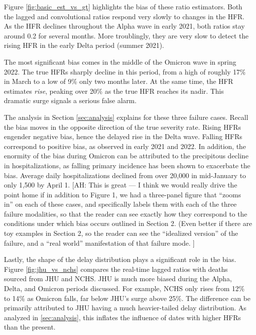 \documentclass{article}
\newcommand{\ahcomment}[1]{{\color{red}[AH: #1]}}
\begin{document}
Figure \ref{fig:basic_est_vs_gt} highlights the bias of these ratio estimators. Both the lagged and convolutional ratios respond very slowly to changes in the HFR. As the HFR declines throughout the Alpha wave in early 2021, both ratios stay around 0.2 for several months. More troublingly, they are very slow to detect the rising HFR in the early Delta period (summer 2021). %

The most significant bias comes in the middle of the Omicron wave in spring 2022. The true HFRs sharply decline in this period, from a high of roughly 17\% in March to a low of 9\% only two months later. At the same time, the HFR estimates \textit{rise}, peaking over 20\% as the true HFR reaches its nadir. This dramatic surge signals a serious false alarm. 

The analysis in Section \ref{sec:analysis} explains for these three failure cases. Recall the bias moves in the opposite direction of the true severity rate. Rising HFRs engender negative bias, hence the delayed rise in the Delta wave. Falling HFRs correspond to positive bias, as observed in early 2021 and 2022. In addition, the enormity of the bias during Omicron can be attributed to the precipitous decline in hospitalizations, as falling primary incidence has been shown to exacerbate the bias. Average daily hospitalizations declined from over 20,000 in mid-January to only 1,500 by April 1. 
\ahcomment{
This is great --- I think we would really drive the point home
if in addition to Figure 1, we had a three-panel figure that
``zooms in'' on each of these cases, and specifically labels them
with each of the three failure modalities, so that the reader
can see exactly how they correspond to the conditions under
which bias occurs outlined in Section 2.  (Even better if
there are toy examples in Section 2, so the reader can see
the ``idealized version'' of the failure, and a ``real world''
manifestation of that failure mode.
}

Lastly, the shape of the delay distribution plays a significant role in the bias. Figure \ref{fig:jhu_vs_nchs} compares the real-time lagged ratios with deaths sourced from JHU and NCHS. JHU is much more biased during the Alpha, Delta, and Omicron periods discussed. For example, NCHS only rises from 12\% to 14\% as Omicron falls, far below JHU's surge above 25\%. The difference can be primarily attributed to JHU having a much heavier-tailed delay distribution. As analyzed in \ref{sec:analysis}, this inflates the influence of dates with higher HFRs than the present.
\end{document}
